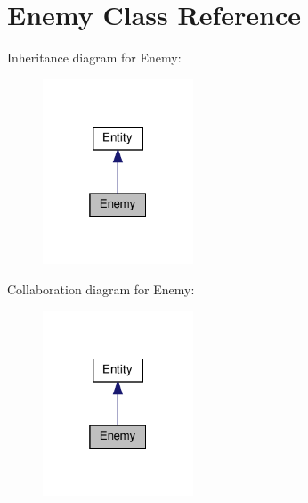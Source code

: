 \hypertarget{class_enemy}{}\section{Enemy Class Reference}
\label{class_enemy}


Inheritance diagram for Enemy\+:
\nopagebreak
\begin{figure}[H]
\begin{center}
\leavevmode
\includegraphics[width=127pt]{class_enemy__inherit__graph}
\end{center}
\end{figure}


Collaboration diagram for Enemy\+:
\nopagebreak
\begin{figure}[H]
\begin{center}
\leavevmode
\includegraphics[width=127pt]{class_enemy__coll__graph}
\end{center}
\end{figure}
